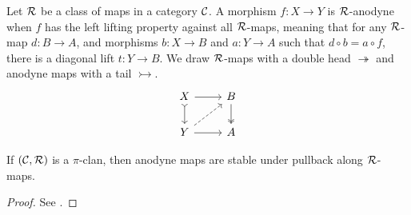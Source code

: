 \begin{definition}
  Let $\mathcal{R}$ be a class of maps in a category $\mathcal{C}$.
  A morphism $f : X \to Y$ is $\mathcal{R}$-anodyne
  when $f$ has the left lifting property against all $\mathcal{R}$-maps,
  meaning that for any $\mathcal{R}$-map $d : B \to A$, and morphisms
  $b : X \to B$ and $a : Y \to A$ such that $d \circ b = a \circ f$,
  there is a diagonal lift $t : Y \to B$.
  We draw $\mathcal{R}$-maps with a double head $\twoheadrightarrow$
  and anodyne maps with a tail $\rightarrowtail$. 
  \[
    \begin{tikzcd}
    X & B \\
    Y & A
    \arrow[from=1-1, to=1-2]
    \arrow[tail, from=1-1, to=2-1]
    \arrow[two heads, from=1-2, to=2-2]
    \arrow[dashed, from=2-1, to=1-2]
    \arrow[from=2-1, to=2-2]
  \end{tikzcd}
  \]
\end{definition}


\begin{lemma}\label{lem:anodyne-pullback}
  If $(\mathcal{C},\mathcal{R})$ is a $\pi$-clan,
  then anodyne maps are stable under pullback along $\mathcal{R}$-maps.
\end{lemma}
\begin{proof}
  See \cite[Lemma 29]{awodey2018}.
\end{proof}

